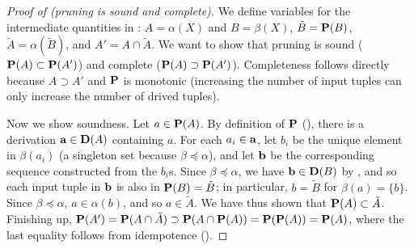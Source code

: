 \begin{proof}[Proof of  (pruning is sound and complete)]
We define variables for the intermediate quantities in :
$A = \alpha(X)$ and $B = \beta(X)$, $\tilde B = \mathbf{P}(B)$, $\tilde A = \alpha(\tilde B)$,
and $A' = A \cap \tilde A$.
We want to show that pruning is sound ($\mathbf{P}(A) \subset \mathbf{P}(A')$)
and complete ($\mathbf{P}(A) \supset \mathbf{P}(A')$).
Completeness follows directly because $A \supset A'$ and $\mathbf{P}$ is monotonic (increasing
the number of input tuples can only increase the number of drived tuples).

Now we show soundness.
Let $a \in \mathbf{P}(A)$.  By definition of $\mathbf{P}$ (), there is a derivation $\mathbf{a} \in \mathbf{D}(A)$ containing $a$.
For each $a_i \in \mathbf{a}$, let $b_i$ be the unique element in $\beta(a_i)$ (a singleton set because $\beta \preceq \alpha$),
and let $\mathbf{b}$ be the corresponding sequence constructed from the $b_i$s.
Since $\beta \preceq \alpha$, we have $\mathbf{b} \in \mathbf{D}(B)$ by ,
and so each input tuple in $\mathbf{b}$ is also in $\mathbf{P}(B) = \tilde B$;
in particular, $b = \tilde B$ for $\beta(a) = \{ b \}$.
Since $\beta \preceq \alpha$, $a \in \alpha(b)$, and so $a \in \tilde A$.
We have thus shown that $\mathbf{P}(A) \subset \tilde A$.
Finishing up, $\mathbf{P}(A') = \mathbf{P}(A \cap \tilde A) \supset \mathbf{P}(A \cap \mathbf{P}(A)) = \mathbf{P}(\mathbf{P}(A)) = \mathbf{P}(A)$,
where the last equality follows from idempotence ().
\end{proof}

